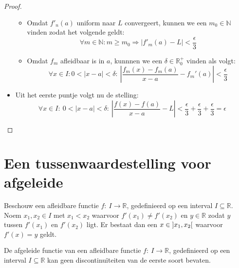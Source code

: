 \documentclass[main.tex]{subfiles}
\begin{document}
\begin{bst}
\begin{proof}
\begin{itemize}
\begin{itemize}
      \item 
        Omdat $f'_{n}(a)$ uniform naar $L$ convergeert, kunnen we een $m_{0} \in \mathbb{N}$ vinden zodat het volgende geldt:
        \[ \forall m\in \mathbb{N}: m \ge m_{0} \Rightarrow \left| f'_{m}(a) - L \right| < \frac{\epsilon}{3}\]
      \item 
        Omdat $f_{m}$ afleidbaar is in $a$, kunnnen we een $\delta \in \mathbb{R}_{0}^{+}$ vinden  als volgt:
        \[ \forall x\in I: 0 < |x-a| < \delta:\ \left| \frac{f_{m}(x)-f_{m}(a)}{x-a} - f_{m}'(a) \right| < \frac{\epsilon}{3} \]
      \end{itemize}
    \item Uit het eerste puntje volgt nu de stelling:
      \[ \forall x\in I:\ 0 < |x-a| < \delta:\ \left| \frac{f(x)-f(a)}{x-a} - L \right|  < \frac{\epsilon}{3}+\frac{\epsilon}{3} +\frac{\epsilon}{3} = \epsilon \]
    \end{itemize}
  \end{proof}
\end{bst}



\section{Een tussenwaardestelling voor afgeleide}
\label{sec:een-tuss-voor}


\begin{bst}
  Beschouw een afleidbare functie $f:\ I \rightarrow \mathbb{R}$, gedefinieerd op een interval $I \subseteq \mathbb{R}$.
  Noem $x_{1},x_{2} \in I$ met $x_{1}< x_{2}$ waarvoor $f'(x_{1}) \neq f'(x_{2})$ en $y\in \mathbb{R}$ zodat $y$ tussen $f'(x_{1})$ en $f'(x_{2})$ ligt.
  Er bestaat dan een $x \in \interval[open]{x_{1}}{x_{2}}$ waarvoor $f'(x) = y$ geldt.
\end{bst}

\begin{gev}
  De afgeleide functie van een afleidbare functie $f:\ I \rightarrow \mathbb{R}$, gedefinieerd op een interval $I \subseteq \mathbb{R}$ kan geen discontinu\"iteiten van de eerste soort bevaten.
\end{gev}
\end{document}
